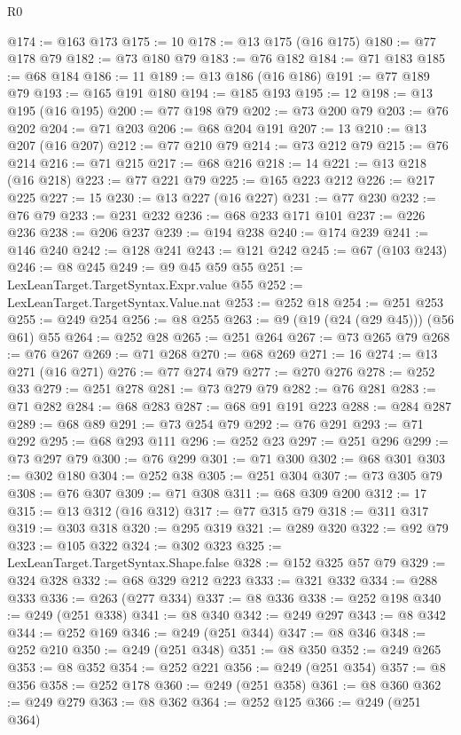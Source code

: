 \begin{lexlean}{R0}
\begin{coremodule}
@174 := @163 @173
@175 := 10
@178 := @13 @175 (@16 @175)
@180 := @77 @178 @79
@182 := @73 @180 @79
@183 := @76 @182
@184 := @71 @183
@185 := @68 @184
@186 := 11
@189 := @13 @186 (@16 @186)
@191 := @77 @189 @79
@193 := @165 @191 @180
@194 := @185 @193
@195 := 12
@198 := @13 @195 (@16 @195)
@200 := @77 @198 @79
@202 := @73 @200 @79
@203 := @76 @202
@204 := @71 @203
@206 := @68 @204 @191
@207 := 13
@210 := @13 @207 (@16 @207)
@212 := @77 @210 @79
@214 := @73 @212 @79
@215 := @76 @214
@216 := @71 @215
@217 := @68 @216
@218 := 14
@221 := @13 @218 (@16 @218)
@223 := @77 @221 @79
@225 := @165 @223 @212
@226 := @217 @225
@227 := 15
@230 := @13 @227 (@16 @227)
@231 := @77 @230
@232 := @76 @79
@233 := @231 @232
@236 := @68 @233 @171 @101
@237 := @226 @236
@238 := @206 @237
@239 := @194 @238
@240 := @174 @239
@241 := @146 @240
@242 := @128 @241
@243 := @121 @242
@245 := @67 (@103 @243)
@246 := @8 @245
@249 := @9 @45 @59 @55
@251 := LexLeanTarget.TargetSyntax.Expr.value @55
@252 := LexLeanTarget.TargetSyntax.Value.nat
@253 := @252 @18
@254 := @251 @253
@255 := @249 @254
@256 := @8 @255
@263 := @9 (@19 (@24 (@29 @45))) (@56 @61) @55
@264 := @252 @28
@265 := @251 @264
@267 := @73 @265 @79
@268 := @76 @267
@269 := @71 @268
@270 := @68 @269
@271 := 16
@274 := @13 @271 (@16 @271)
@276 := @77 @274 @79
@277 := @270 @276
@278 := @252 @33
@279 := @251 @278
@281 := @73 @279 @79
@282 := @76 @281
@283 := @71 @282
@284 := @68 @283
@287 := @68 @91 @191 @223
@288 := @284 @287
@289 := @68 @89
@291 := @73 @254 @79
@292 := @76 @291
@293 := @71 @292
@295 := @68 @293 @111
@296 := @252 @23
@297 := @251 @296
@299 := @73 @297 @79
@300 := @76 @299
@301 := @71 @300
@302 := @68 @301
@303 := @302 @180
@304 := @252 @38
@305 := @251 @304
@307 := @73 @305 @79
@308 := @76 @307
@309 := @71 @308
@311 := @68 @309 @200
@312 := 17
@315 := @13 @312 (@16 @312)
@317 := @77 @315 @79
@318 := @311 @317
@319 := @303 @318
@320 := @295 @319
@321 := @289 @320
@322 := @92 @79
@323 := @105 @322
@324 := @302 @323
@325 := LexLeanTarget.TargetSyntax.Shape.false
@328 := @152 @325 @57 @79
@329 := @324 @328
@332 := @68 @329 @212 @223
@333 := @321 @332
@334 := @288 @333
@336 := @263 (@277 @334)
@337 := @8 @336
@338 := @252 @198
@340 := @249 (@251 @338)
@341 := @8 @340
@342 := @249 @297
@343 := @8 @342
@344 := @252 @169
@346 := @249 (@251 @344)
@347 := @8 @346
@348 := @252 @210
@350 := @249 (@251 @348)
@351 := @8 @350
@352 := @249 @265
@353 := @8 @352
@354 := @252 @221
@356 := @249 (@251 @354)
@357 := @8 @356
@358 := @252 @178
@360 := @249 (@251 @358)
@361 := @8 @360
@362 := @249 @279
@363 := @8 @362
@364 := @252 @125
@366 := @249 (@251 @364)

\end{coremodule}
\end{lexlean}
